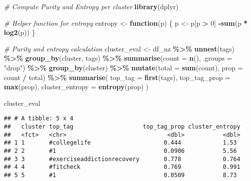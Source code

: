 \documentclass[
]{article}
\newenvironment{Shaded}{\begin{snugshade}}{\end{snugshade}}
\newcommand{\AttributeTok}[1]{\textcolor[rgb]{0.13,0.29,0.53}{#1}}
\newcommand{\CommentTok}[1]{\textcolor[rgb]{0.56,0.35,0.01}{\textit{#1}}}
\newcommand{\ControlFlowTok}[1]{\textcolor[rgb]{0.13,0.29,0.53}{\textbf{#1}}}
\newcommand{\DecValTok}[1]{\textcolor[rgb]{0.00,0.00,0.81}{#1}}
\newcommand{\FunctionTok}[1]{\textcolor[rgb]{0.13,0.29,0.53}{\textbf{#1}}}
\newcommand{\NormalTok}[1]{#1}
\newcommand{\OtherTok}[1]{\textcolor[rgb]{0.56,0.35,0.01}{#1}}
\newcommand{\SpecialCharTok}[1]{\textcolor[rgb]{0.81,0.36,0.00}{\textbf{#1}}}
\newcommand{\StringTok}[1]{\textcolor[rgb]{0.31,0.60,0.02}{#1}}
\begin{document}
\begin{Shaded}
\begin{Highlighting}[]
\CommentTok{\# Compute Purity and Entropy per cluster}
\FunctionTok{library}\NormalTok{(dplyr)}

\CommentTok{\# Helper function for entropy}
\NormalTok{entropy }\OtherTok{\textless{}{-}} \ControlFlowTok{function}\NormalTok{(p) \{}
\NormalTok{  p }\OtherTok{\textless{}{-}}\NormalTok{ p[p }\SpecialCharTok{\textgreater{}} \DecValTok{0}\NormalTok{]}
  \SpecialCharTok{{-}}\FunctionTok{sum}\NormalTok{(p }\SpecialCharTok{*} \FunctionTok{log2}\NormalTok{(p))}
\NormalTok{\}}

\CommentTok{\# Purity and entropy calculation}
\NormalTok{cluster\_eval }\OtherTok{\textless{}{-}}\NormalTok{ df\_nz }\SpecialCharTok{\%\textgreater{}\%}
  \FunctionTok{unnest}\NormalTok{(tags) }\SpecialCharTok{\%\textgreater{}\%}
  \FunctionTok{group\_by}\NormalTok{(cluster, tags) }\SpecialCharTok{\%\textgreater{}\%}
  \FunctionTok{summarise}\NormalTok{(}\AttributeTok{count =} \FunctionTok{n}\NormalTok{(), }\AttributeTok{.groups =} \StringTok{"drop"}\NormalTok{) }\SpecialCharTok{\%\textgreater{}\%}
  \FunctionTok{group\_by}\NormalTok{(cluster) }\SpecialCharTok{\%\textgreater{}\%}
  \FunctionTok{mutate}\NormalTok{(}\AttributeTok{total =} \FunctionTok{sum}\NormalTok{(count),}
         \AttributeTok{prop =}\NormalTok{ count }\SpecialCharTok{/}\NormalTok{ total) }\SpecialCharTok{\%\textgreater{}\%}
  \FunctionTok{summarise}\NormalTok{(}
    \AttributeTok{top\_tag =} \FunctionTok{first}\NormalTok{(tags),}
    \AttributeTok{top\_tag\_prop =} \FunctionTok{max}\NormalTok{(prop),}
    \AttributeTok{cluster\_entropy =} \FunctionTok{entropy}\NormalTok{(prop)}
\NormalTok{  )}

\NormalTok{cluster\_eval}
\end{Highlighting}
\end{Shaded}

\begin{verbatim}
## # A tibble: 5 x 4
##   cluster top_tag                    top_tag_prop cluster_entropy
##   <fct>   <chr>                             <dbl>           <dbl>
## 1 1       #collegelife                     0.444            1.53 
## 2 2       #1                               0.0906           5.56 
## 3 3       #exerciseaddictionrecovery       0.778            0.764
## 4 4       #fitcheck                        0.769            0.991
## 5 5       #1                               0.0509           8.73
\end{verbatim}
\end{document}
